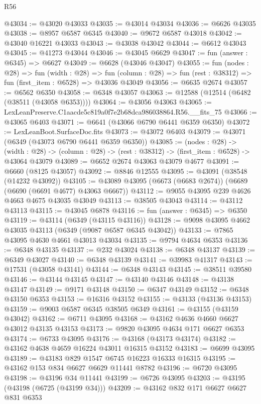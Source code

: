 \begin{lexlean}{R56}
\begin{coremodule}
@43034 := @43020 @43033
@43035 := @43014 @43034
@43036 := @6626 @43035
@43038 := @8957 @6587 @6345
@43040 := @9672 @6587 @43018
@43042 := @43040 @16221 @43033
@43043 := @43038 @43042
@43044 := @6612 @43043
@43045 := @41273 @43044
@43046 := @43045 @6629
@43047 := fun (answer : @6345) => @6627
@43049 := @6628 (@43046 @43047)
@43055 := fun (nodes : @28) =>
  fun (width : @28) =>
  fun (column : @28) => fun (rest : @38312) => fun (first_item : @6528) => @43036 @43049
@43056 := @6635 @2674
@43057 := @6562 @6350
@43058 := @6348 @43057
@43063 := @12588 (@12514 (@6482 (@38511 (@43058 @6353))))
@43064 := @43056 @43063
@43065 := LexLeanPreserve.C1aacde5c819a0f7e2b68dca986038864.R56.__fits_75
@43066 := @43065 @6403
@43071 := @6641 (@43066 @6790 @6441 @6359 @6350)
@43072 := LexLeanBoot.SurfaceDoc.fits
@43073 := @43072 @6403
@43079 := @43071 (@6349 (@43073 @6790 @6441 @6359 @6350))
@43085 := (nodes : @28) ->
  (width : @28) -> (column : @28) -> (rest : @38312) -> (first_item : @6528) -> @43064 @43079
@43089 := @6652 @2674 @43063 @43079 @4677
@43091 := @6660 (@8125 @43057)
@43092 := @8846 @12555
@43095 := @43091 (@38548 (@14232 @43092))
@43105 := @43089 @43095 (@6673 (@6683 @2674)) (@6689 (@6690 (@6691 @4677) @43063 @6667))
@43112 := @9055 @43095 @239 @4626 @4663 @4675 @43035 @43049
@43113 := @38505 @43043
@43114 := @43112 @43113
@43115 := @43045 @6878
@43116 := fun (answer : @6345) => @6350
@43119 := @43114 (@6349 (@43115 @43116))
@43128 := @9098 @43095 @4662 @43035 @43113 (@6349 (@9087 @6587 @6345 @43042))
@43133 := @7865 @43095 @4630 @4661 @43013 @43034
@43135 := @9794 @4634 @6353
@43136 := @6348 @43135
@43137 := @232 @43024
@43138 := @6348 @43137
@43139 := @6349 @43027
@43140 := @6348 @43139
@43141 := @39983 @41317
@43143 := @17531 (@43058 @43141)
@43144 := @6348 @43143
@43145 := @38511 @39580
@43146 := @43144 @43145
@43147 := @43140 @43146
@43148 := @43138 @43147
@43149 := @9171 @43148
@43150 := @6347 @43149
@43152 := @6348 @43150 @6353
@43153 := @16316 @43152
@43155 := @43133 (@43136 @43153)
@43159 := @9003 @6587 @6345 @38505 @6349
@43161 := @43155 (@43159 @43042)
@43162 := @6711 @43095
@43168 := @43162 @4636 @4660 @6627 @43012 @43135 @43153
@43173 := @9820 @43095 @4634 @171 @6627 @6353
@43174 := @6733 @43095
@43176 := @43168 (@43173 @43174)
@43182 := @43162 @4638 @4659 @16224 @43011 @16315 @43152
@43183 := @6699 @43095
@43189 := @43183 @829 @1547 @6745 @16223 @16333 @16315
@43195 := @43162 @153 @834 @6627 @6629 @11441 @8782
@43196 := @6720 @43095
@43198 := @43196 @34 @11441
@43199 := @6726 @43095
@43203 := @43195 (@43198 (@6725 (@43199 @34)))
@43209 := @43162 @832 @171 @6627 @6627 @831 @6353

\end{coremodule}
\end{lexlean}
